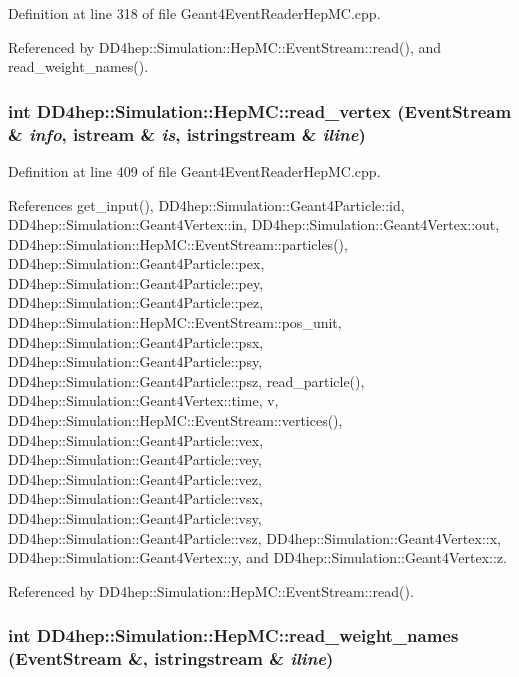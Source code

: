 Definition at line 318 of file Geant4EventReaderHepMC.cpp.

Referenced by DD4hep::Simulation::HepMC::EventStream::read(), and read\_\-weight\_\-names().\hypertarget{namespace_d_d4hep_1_1_simulation_1_1_hep_m_c_a05115a3e0b60dbe2ee86c5094cdd16bc}{
\subsubsection[{read\_\-vertex}]{\setlength{\rightskip}{0pt plus 5cm}int DD4hep::Simulation::HepMC::read\_\-vertex (EventStream \& {\em info}, \/  istream \& {\em is}, \/  istringstream \& {\em iline})}}
\label{namespace_d_d4hep_1_1_simulation_1_1_hep_m_c_a05115a3e0b60dbe2ee86c5094cdd16bc}


Definition at line 409 of file Geant4EventReaderHepMC.cpp.

References get\_\-input(), DD4hep::Simulation::Geant4Particle::id, DD4hep::Simulation::Geant4Vertex::in, DD4hep::Simulation::Geant4Vertex::out, DD4hep::Simulation::HepMC::EventStream::particles(), DD4hep::Simulation::Geant4Particle::pex, DD4hep::Simulation::Geant4Particle::pey, DD4hep::Simulation::Geant4Particle::pez, DD4hep::Simulation::HepMC::EventStream::pos\_\-unit, DD4hep::Simulation::Geant4Particle::psx, DD4hep::Simulation::Geant4Particle::psy, DD4hep::Simulation::Geant4Particle::psz, read\_\-particle(), DD4hep::Simulation::Geant4Vertex::time, v, DD4hep::Simulation::HepMC::EventStream::vertices(), DD4hep::Simulation::Geant4Particle::vex, DD4hep::Simulation::Geant4Particle::vey, DD4hep::Simulation::Geant4Particle::vez, DD4hep::Simulation::Geant4Particle::vsx, DD4hep::Simulation::Geant4Particle::vsy, DD4hep::Simulation::Geant4Particle::vsz, DD4hep::Simulation::Geant4Vertex::x, DD4hep::Simulation::Geant4Vertex::y, and DD4hep::Simulation::Geant4Vertex::z.

Referenced by DD4hep::Simulation::HepMC::EventStream::read().\hypertarget{namespace_d_d4hep_1_1_simulation_1_1_hep_m_c_a9a0a541fc8f48d5f9b80131b7f3b7e88}{
\subsubsection[{read\_\-weight\_\-names}]{\setlength{\rightskip}{0pt plus 5cm}int DD4hep::Simulation::HepMC::read\_\-weight\_\-names (EventStream \&, \/  istringstream \& {\em iline})}}
\label{namespace_d_d4hep_1_1_simulation_1_1_hep_m_c_a9a0a541fc8f48d5f9b80131b7f3b7e88}


